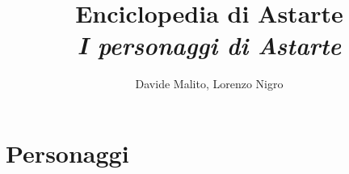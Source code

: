 \documentclass{book}
\author{Davide Malito, Lorenzo Nigro}
\title{Enciclopedia di Astarte \\ \small{\it{I personaggi di Astarte}}}
\begin{document}
\maketitle
\tableofcontents

\chapter{Personaggi}
\newpage

\end{document}
